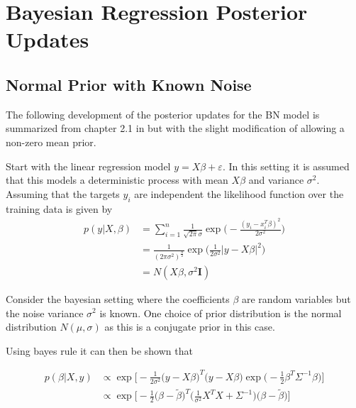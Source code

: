 \appendix

\chapter{Bayesian Regression Posterior Updates}

\section{Normal Prior with Known Noise}{\label{a:bn}

The following development of the posterior updates for the BN model is summarized from chapter 2.1 in \cite{rasmussen_2006} but with the slight modification of allowing a non-zero mean prior. 

Start with the linear regression model $y=X\beta + \varepsilon$. In this setting it is assumed that this models a deterministic process with mean $X\beta$ and variance $\sigma^2$. Assuming that the targets $y_i$ are independent the likelihood function over the training data is given by
\begin{equation}
    \begin{split}
        p(y|X,\beta) &= \sum^n_{i=1} \frac{1}{\sqrt{2\pi}\sigma}\exp\Bigg(-\frac{(y_i - x_i^T\beta)^2}{2\sigma^2}\Bigg)\\
        &=\frac{1}{(2\pi\sigma^2)^\frac{n}{2}}\exp\bigg(\frac{1}{2\sigma^2}|y - X\beta|^2\bigg)\\
        &= N(X\beta, \sigma^2\bm{I})
    \end{split}
\end{equation}

Consider the bayesian setting where the coefficients $\beta$ are random variables but the noise variance $\sigma^2$ is known. One choice of prior distribution is the normal distribution $N(\mu, \sigma)$ as this is a conjugate prior in this case.

Using bayes rule it can then be shown that

\begin{equation}
    \label{eq:post_proof_bn}
    \begin{split}
        p(\beta|X,y) &\propto \exp\bigg[-\frac{1}{2\sigma^2}\big(y-X\beta\big)^T\big(y-X\beta\big)\exp\bigg(-\frac{1}{2}\beta^T\Sigma^{-1}\beta\bigg)\bigg] \\
        &\propto \exp\bigg[-\frac{1}{2}\Big(\beta-\tilde{\beta}\Big)^T\Big(\frac{1}{\sigma^2}X^TX + \Sigma^{-1}\Big)\Big(\beta - \tilde{\beta}\Big)\bigg]
    \end{split}
\end{equation}

}
